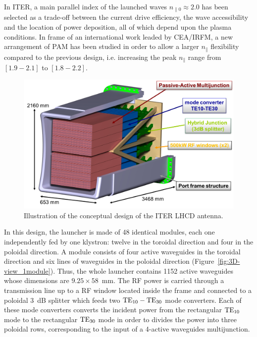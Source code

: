 {In ITER, a main parallel index of the launched waves $n_{\parallel 0} \approx 2.0$ has been selected as a trade-off between the current drive efficiency, the wave accessibility and the location of power deposition, all of which depend upon the plasma conditions. In frame of an international work leaded by CEA/IRFM, a new arrangement of PAM has been studied in order to allow a larger $n_{\parallel}$ flexibility compared to the previous design\cite{bibet2005-1}, i.e. increasing the peak $n_{\parallel}$ range from $\left[1.9-2.1\right]$ to $\left[1.8-2.2\right]$. 

\begin{figure}
	\centering
	\includegraphics[width=1.0\linewidth]{figures/chap3/ITER_antenna/ITER_LH_antenna}
	\caption{Illustration of the conceptual design of the ITER LHCD antenna. }
	\label{fig:iterlhantenna}
\end{figure}

In this design, the launcher is made of 48 identical modules, each one independently fed by one klystron: twelve in the toroidal direction and four in the poloidal direction. A module consists of four active waveguides in the toroidal direction and six lines of waveguides in the poloidal direction (Figure~\ref{fig:3D-view_1module}). Thus, the whole launcher contains 1152 active waveguides whose dimensions are $9.25\times58$~mm. The RF power is carried through a transmission line up to a RF window
located inside the frame and connected to a poloidal 3~dB splitter which feeds two ${\mathrm{TE}}_{10}-{\mathrm{TE}}_{30}$ mode converters. Each of these mode converters converts the incident power from the rectangular ${\mathrm{TE}}_{10}$ mode to the rectangular ${\mathrm{TE}}_{30}$ mode in order to divides the power into three poloidal rows, corresponding to the input of a 4-active waveguides multijunction. 

}
